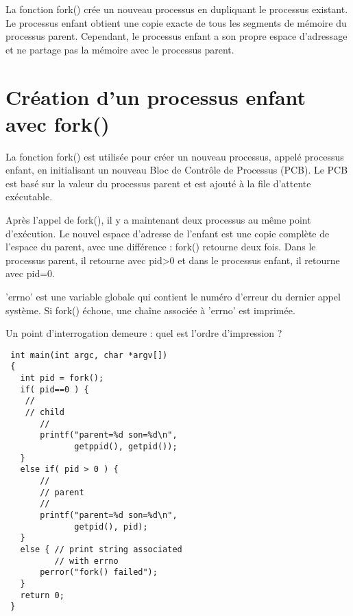 \documentclass[12pt]{report}
\begin{document}
\begin{tcolorbox}[ 
  colback=green!10, 
  colframe=green, 
  title={\fontfamily{lmr}\selectfont \faLightbulb Intuition}, 
  fonttitle=\bfseries, 
  fontupper=\fontfamily{lmr}\selectfont, 
  boxrule=1pt, 
  sharp corners, 
] 
 La fonction fork() crée un nouveau processus en dupliquant le processus existant. Le processus enfant obtient une copie exacte de tous les segments de mémoire du processus parent. Cependant, le processus enfant a son propre espace d'adressage et ne partage pas la mémoire avec le processus parent. 
\end{tcolorbox}
\section{Création d'un processus enfant avec fork()} 
 La fonction fork() est utilisée pour créer un nouveau processus, appelé processus enfant, en initialisant un nouveau Bloc de Contrôle de Processus (PCB). Le PCB est basé sur la valeur du processus parent et est ajouté à la file d'attente exécutable. 
 
 Après l'appel de fork(), il y a maintenant deux processus au même point d'exécution. Le nouvel espace d'adresse de l'enfant est une copie complète de l'espace du parent, avec une différence : fork() retourne deux fois. Dans le processus parent, il retourne avec pid>0 et dans le processus enfant, il retourne avec pid=0. 
 
 'errno' est une variable globale qui contient le numéro d'erreur du dernier appel système. Si fork() échoue, une chaîne associée à 'errno' est imprimée. 
 
 Un point d'interrogation demeure : quel est l'ordre d'impression ?
\begin{lstlisting} 
 int main(int argc, char *argv[]) 
 { 
   int pid = fork(); 
   if( pid==0 ) { 
    // 
    // child 
       // 
       printf("parent=%d son=%d\n", 
              getppid(), getpid()); 
   } 
   else if( pid > 0 ) { 
       // 
       // parent 
       // 
       printf("parent=%d son=%d\n", 
              getpid(), pid); 
   } 
   else { // print string associated 
          // with errno    
       perror("fork() failed");  
   } 
   return 0; 
 } 
\end{lstlisting}
\end{document}

